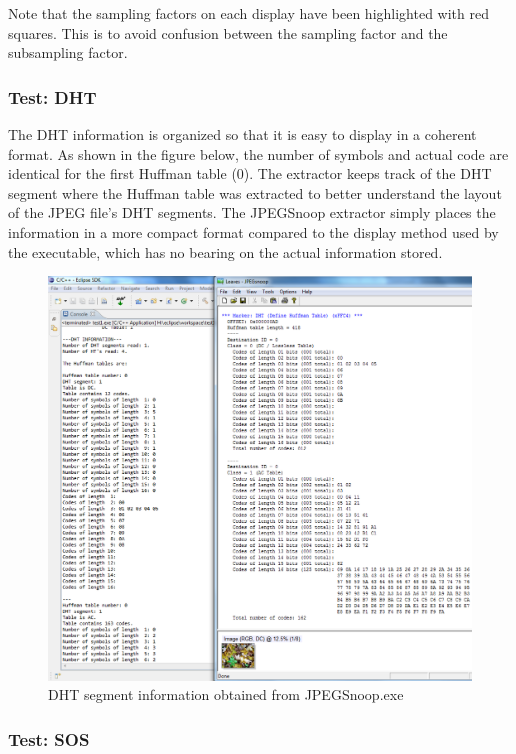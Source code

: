 Note that the sampling factors on each display have
been highlighted with red squares. This is to avoid 
confusion between the sampling factor and the 
subsampling factor.

\subsubsection{Test: DHT}

The DHT information is organized so that it is easy to display in
a coherent format. As shown in the figure below, the number of
symbols and actual code are identical for the first Huffman table (0).
The extractor keeps track of the DHT segment where the Huffman
table was extracted to better understand the layout of the JPEG
file's DHT segments. The JPEGSnoop extractor simply places the
information in a more compact format compared to the display 
method used by the executable, which has no bearing on the actual
information stored.

\begin{figure}[!hbtp]
\label{LeavesImage}
\begin{center}
\includegraphics[scale=0.5]{figures/jpegDHTtest1.png} 
\end{center}
\caption{DHT segment information obtained from JPEGSnoop.exe}
\end{figure}

\subsubsection{Test: SOS}

